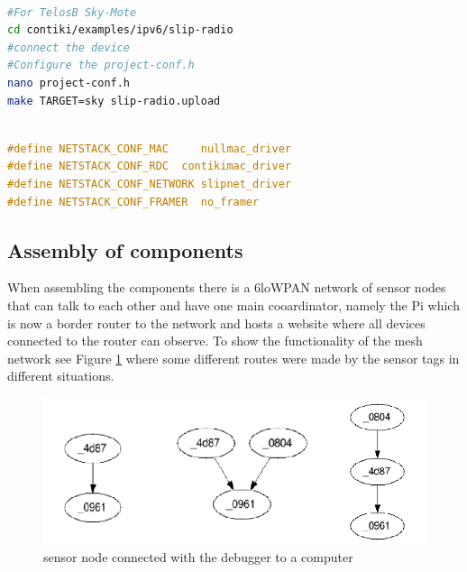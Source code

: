 \begin{lstlisting}[basicstyle=\small,language=bash,caption={Setting for the TelosB mote}]

#For TelosB Sky-Mote
cd contiki/examples/ipv6/slip-radio
#connect the device
#Configure the project-conf.h
nano project-conf.h
make TARGET=sky slip-radio.upload
\end{lstlisting}

\begin{lstlisting}[basicstyle=\small,language=c,caption={Setting for the TelosB mote}]

#define NETSTACK_CONF_MAC     nullmac_driver
#define NETSTACK_CONF_RDC  contikimac_driver
#define NETSTACK_CONF_NETWORK slipnet_driver
#define NETSTACK_CONF_FRAMER  no_framer
\end{lstlisting}

\subsection{Assembly of components}

When assembling the components there is a 6loWPAN network of sensor nodes that can talk to each other and have one main cooardinator, namely the Pi which is now a border router to the network and hosts a website where all devices connected to the router can observe. To show the functionality of the mesh network see Figure \ref{fig:Mesh} where some different routes were made by the sensor tags in different situations.

\begin{figure}[!h]
	\begin{center} 	
		\includegraphics[width=0.8\linewidth]{mesh}
		\caption{sensor node connected with the debugger to a computer}
		\label{fig:Mesh}
	\end{center}
\end{figure} 

